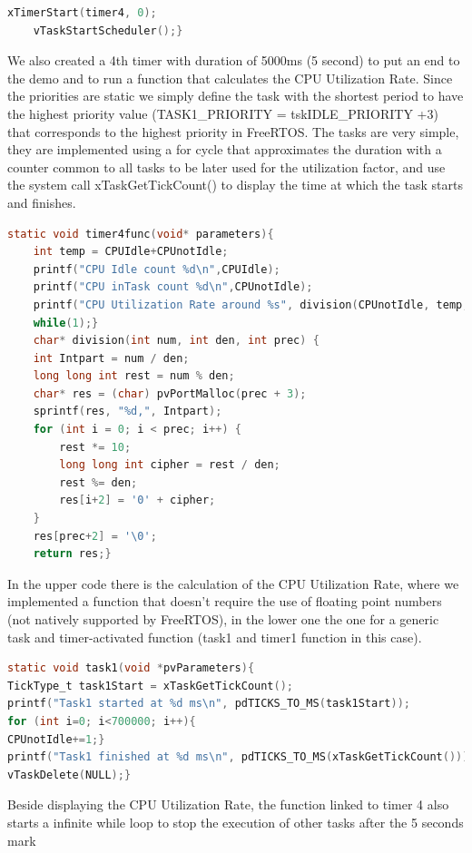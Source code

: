 \documentclass[9pt, reqno]{amsart}
\theoremstyle{definition}
\theoremstyle{remark}
\numberwithin{equation}{section}
\begin{document}
{\begin{lstlisting}[breaklines=true, basicstyle=\bfseries,language=c,basicstyle=\small]
    xTimerStart(timer4, 0);
    vTaskStartScheduler();}
\end{lstlisting}
We also created a 4th timer with duration of 5000ms (5 second) to put an end to the demo and to run a function that calculates the CPU Utilization Rate.
Since the priorities are static we simply define the task with the shortest period to have the highest priority value (TASK1\_PRIORITY = tskIDLE\_PRIORITY +3) that corresponds to the highest priority in FreeRTOS.
The tasks are very simple, they are implemented using a for cycle that approximates the duration with a counter common to all tasks to be later used for the utilization factor, and use the system call xTaskGetTickCount()  to display the time at which the task starts and finishes.
\begin{lstlisting}[breaklines=true, basicstyle=\bfseries,language=c,basicstyle=\small]
static void timer4func(void* parameters){
    int temp = CPUIdle+CPUnotIdle;
    printf("CPU Idle count %d\n",CPUIdle);
    printf("CPU inTask count %d\n",CPUnotIdle);
    printf("CPU Utilization Rate around %s", division(CPUnotIdle, temp, 3));
    while(1);}
    char* division(int num, int den, int prec) {
    int Intpart = num / den;
    long long int rest = num % den;
    char* res = (char) pvPortMalloc(prec + 3); 
    sprintf(res, "%d,", Intpart);
    for (int i = 0; i < prec; i++) {
        rest *= 10;
        long long int cipher = rest / den;
        rest %= den;
        res[i+2] = '0' + cipher; 
    }
    res[prec+2] = '\0'; 
    return res;}
\end{lstlisting}
In the upper code there is the calculation of the CPU Utilization Rate, where we implemented a function that doesn’t require the use of floating point numbers (not natively supported by FreeRTOS), in the lower one the one for a generic task and timer-activated function (task1 and timer1 function in this case).
\begin{lstlisting}[breaklines=true, basicstyle=\bfseries,language=c,basicstyle=\small]
static void task1(void *pvParameters){
TickType_t task1Start = xTaskGetTickCount();
printf("Task1 started at %d ms\n", pdTICKS_TO_MS(task1Start));
for (int i=0; i<700000; i++){
CPUnotIdle+=1;}
printf("Task1 finished at %d ms\n", pdTICKS_TO_MS(xTaskGetTickCount()));
vTaskDelete(NULL);}
\end{lstlisting}
Beside displaying the CPU Utilization Rate, the function linked to timer 4 also starts a infinite while loop to stop the execution of other tasks after the 5 seconds mark



}
\end{document}
